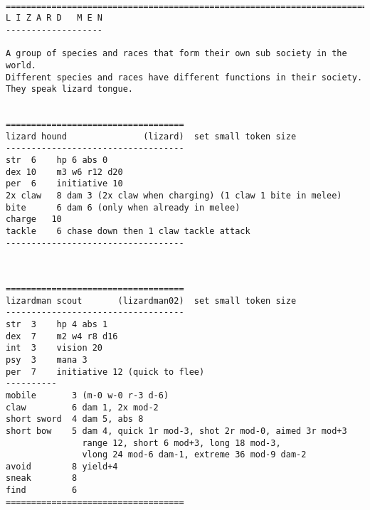 \







\goodbreak
 {}

\goodbreak \begin{samepage} \small \begin{verbatim}
================================================================================
L I Z A R D   M E N
-------------------

A group of species and races that form their own sub society in the world.
Different species and races have different functions in their society.
They speak lizard tongue.


===================================
lizard hound               (lizard)  set small token size
-----------------------------------
str  6    hp 6 abs 0
dex 10    m3 w6 r12 d20
per  6    initiative 10
2x claw   8 dam 3 (2x claw when charging) (1 claw 1 bite in melee)
bite      6 dam 6 (only when already in melee)
charge   10
tackle    6 chase down then 1 claw tackle attack
-----------------------------------
\end{verbatim} \normalsize \end{samepage}

\

\goodbreak \begin{samepage} \small \begin{verbatim}
===================================
lizardman scout       (lizardman02)  set small token size
-----------------------------------
str  3    hp 4 abs 1
dex  7    m2 w4 r8 d16
int  3    vision 20
psy  3    mana 3
per  7    initiative 12 (quick to flee)
----------
mobile       3 (m-0 w-0 r-3 d-6)
claw         6 dam 1, 2x mod-2
short sword  4 dam 5, abs 8
short bow    5 dam 4, quick 1r mod-3, shot 2r mod-0, aimed 3r mod+3
               range 12, short 6 mod+3, long 18 mod-3,
               vlong 24 mod-6 dam-1, extreme 36 mod-9 dam-2
avoid        8 yield+4
sneak        8
find         6
===================================
\end{verbatim} \normalsize \end{samepage}

\

